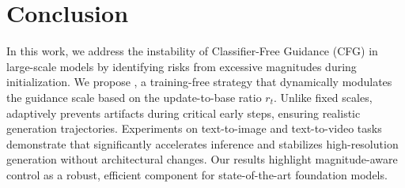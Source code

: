 \section{Conclusion}

In this work, we address the instability of Classifier-Free Guidance (CFG) in large-scale models by identifying risks from excessive magnitudes during initialization. We propose \mtdbk, a training-free strategy that dynamically modulates the guidance scale based on the update-to-base ratio $r_t$. Unlike fixed scales, \mtdbk adaptively prevents artifacts during critical early steps, ensuring realistic generation trajectories. Experiments on text-to-image and text-to-video tasks demonstrate that \mtdbk significantly accelerates inference and stabilizes high-resolution generation without architectural changes. Our results highlight magnitude-aware control as a robust, efficient component for state-of-the-art foundation models.





